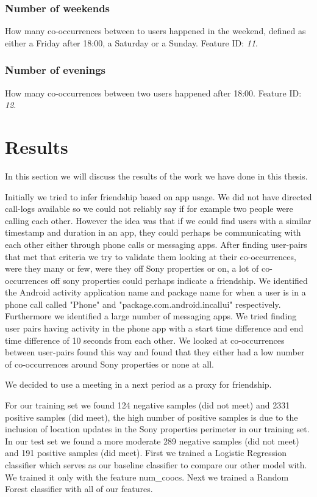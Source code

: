 \subsubsection{Number of weekends}
How many co-occurrences between to users happened in the weekend, defined as either a Friday after 18:00, a Saturday or a Sunday.
Feature ID: \textit{11}.

\subsubsection{Number of evenings}
How many co-occurrences between two users happened after 18:00.
Feature ID: \textit{12}.

\section{Results}
In this section we will discuss the results of the work we have done in this thesis.

Initially we tried to infer friendship based on app usage. We did not have directed call-logs available so we could not reliably say if for example two people were calling each other. However the idea was that if we could find users with a similar timestamp and duration in an app, they could perhaps be communicating with each other either through phone calls or messaging apps. After finding user-pairs that met that criteria we try to validate them looking at their co-occurrences, were they many or few, were they off Sony properties or on, a lot of co-occurrences off sony properties could perhaps indicate a friendship. We identified the Android activity application name and package name for when a user is in a phone call called "Phone" and "package.com.android.incallui" respectively. Furthermore we identified a large number of messaging apps. We tried finding user pairs having activity in the phone app with a start time difference and end time difference of 10 seconds from each other. We looked at co-occurrences between user-pairs found this way and found that they either had a low number of co-occurrences around Sony properties or none at all.

We decided to use a meeting in a next period as a proxy for friendship.

For our training set we found 124 negative samples (did not meet) and 2331 positive samples (did meet), the high number of positive samples is due to the inclusion of location updates in the Sony properties perimeter in our training set. In our test set we found a more moderate 289 negative samples (did not meet) and 191 positive samples (did meet).
First we trained a Logistic Regression classifier which serves as our baseline classifier to compare our other model with. We trained it only with the feature num\_coocs. Next we trained a Random Forest classifier with all of our features.


